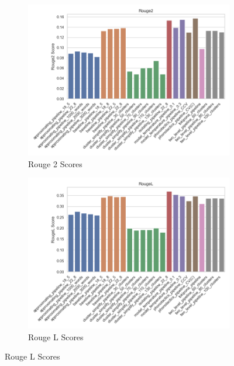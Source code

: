 \begin{figure}[H]
    \begin{subfigure}[b]{0.48\linewidth}
        \includegraphics[width=0.7\linewidth]{figures/results/rouge2_scores.png}
        \caption{Rouge 2 Scores}
        \label{fig:rouge2-scores}
    \end{subfigure}
    \hfill
    \begin{subfigure}[b]{0.48\linewidth}
        \includegraphics[width=0.7\linewidth]{figures/results/rougeL_scores.png}
        \caption{Rouge L Scores}
        \label{fig:rougel-scores}
    \end{subfigure}


\end{figure}
